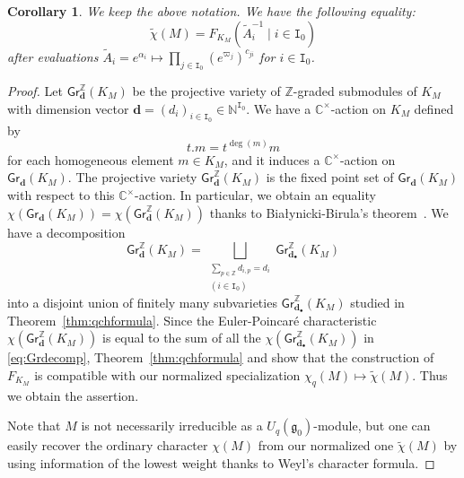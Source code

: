 \documentclass[12pt]{amsart}
\newtheorem{corollary}[theorem]{Corollary}
\theoremstyle{definition}
\theoremstyle{remark}
\numberwithin{equation}{section}
\begin{document}
\begin{corollary}\label{cor:qchformula}
    We keep the above notation. We have the following equality:
    \[\widetilde{\chi}(M)= F_{K_M}(\widetilde{A}_i^{-1} \mid i\in \mathtt{I}_0)\]
    after evaluations $\widetilde{A}_i=e^{\alpha_i}\mapsto \prod_{j\in \mathtt{I}_0}(e^{\varpi_j})^{c_{ji}}$ for $i\in\mathtt{I}_0$.
\end{corollary}
\begin{proof}
    Let $\mathsf{Gr}^{\mathbb{Z}}_{\mathbf{d}}(K_M)$ be the projective variety of $\mathbb{Z}$-graded submodules of $K_M$ with dimension vector $\mathbf{d}=(d_i)_{i\in \mathtt{I}_0}\in \mathbb{N}^{\mathtt{I}_0}$.
    We have a $\mathbb{C}^{\times}$-action on $K_M$ defined by
    \[t. m = t^{\deg(m)}m\]
    for each homogeneous element $m \in K_M$, and it induces a $\mathbb{C}^{\times}$-action on $\mathsf{Gr}_{\mathbf{d}}(K_M)$.
    The projective variety $\mathsf{Gr}^{\mathbb{Z}}_{\mathbf{d}}(K_M)$ is the fixed point set of $\mathsf{Gr}_{\mathbf{d}}(K_M)$ with respect to this $\mathbb{C}^{\times}$-action. In particular, we obtain an equality
$\chi(\mathsf{Gr}_{\mathbf{d}}(K_M))=\chi(\mathsf{Gr}^{\mathbb{Z}}_{\mathbf{d}}(K_M))$
    thanks to Bia{\l}ynicki-Birula's theorem~\cite{BB73}.
    We have a decomposition
    \begin{equation}\label{eq:Grdecomp}
        \mathsf{Gr}^{\mathbb{Z}}_{\mathbf{d}}(K_M)= \bigsqcup_{\substack{\sum_{p\in \mathbb{Z}}d_{i,p}=d_i\\ (i\in \mathtt{I}_0)}}\mathsf{Gr}^{\mathbb{Z}}_{\mathbf{d}_{\bullet}}(K_M)
    \end{equation}
    into a disjoint union of finitely many subvarieties $\mathsf{Gr}^{\mathbb{Z}}_{\mathbf{d}_{\bullet}}(K_M)$ studied in Theorem~\ref{thm:qchformula}.  Since the Euler-Poincar\'e characteristic $\chi(\mathsf{Gr}^{\mathbb{Z}}_{\mathbf{d}}(K_M))$ is equal to the sum of all the $\chi(\mathsf{Gr}^{\mathbb{Z}}_{\mathbf{d}_{\bullet}}(K_M))$ in \eqref{eq:Grdecomp}, Theorem~\ref{thm:qchformula} and \cite[Theorem~3]{FR99} show that the construction of $F_{K_M}$ is compatible with our normalized specialization $\chi_q(M)\mapsto \widetilde{\chi}(M)$. Thus we obtain the assertion.
    
    Note that $M$ is not necessarily irreducible as a $U_q(\mathfrak{g}_0)$-module, but one can easily recover the ordinary character $\chi(M)$ from our normalized one $\widetilde{\chi}(M)$ by using information of the lowest weight thanks to Weyl's character formula.
\end{proof}
\end{document}
